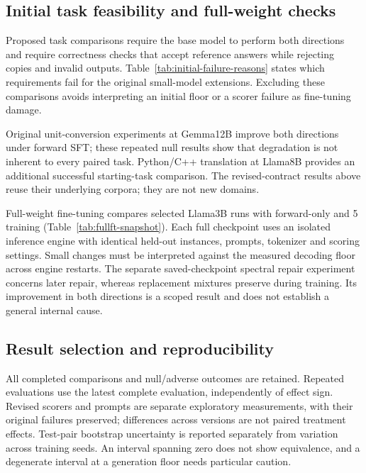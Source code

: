 \subsection{Initial task feasibility and full-weight checks}
\label{app:boundaries}
Proposed task comparisons require the base model to perform both directions and require
correctness checks that accept reference answers while rejecting copies and invalid outputs.
Table~\ref{tab:initial-failure-reasons} states which requirements fail for the original
small-model extensions. Excluding these comparisons avoids interpreting an initial floor
or a scorer failure as fine-tuning damage.



Original unit-conversion experiments at Gemma12B improve both directions under forward SFT;
these repeated null results show that degradation is not inherent to every paired task.
Python/C++ translation at Llama8B provides an additional successful starting-task comparison.
The revised-contract results above reuse their underlying corpora; they are not new domains.

Full-weight fine-tuning compares selected Llama3B runs with forward-only and 5\\%
training (Table~\ref{tab:fullft-snapshot}). Each full checkpoint uses an isolated inference
engine with identical held-out instances, prompts, tokenizer and scoring settings. Small
changes must be interpreted against the measured decoding floor across engine restarts.
The separate saved-checkpoint spectral repair experiment concerns later repair, whereas
replacement mixtures preserve during training. Its improvement in both directions is a
scoped result and does not establish a general internal cause.


\subsection{Result selection and reproducibility}
\label{app:reproducibility}
All completed comparisons and null/adverse outcomes are retained. Repeated evaluations use
the latest complete evaluation, independently of effect sign. Revised scorers and prompts
are separate exploratory measurements, with their original failures preserved; differences
across versions are not paired treatment effects. Test-pair bootstrap uncertainty is reported
separately from variation across training seeds. An interval spanning zero does not show
equivalence, and a degenerate interval at a generation floor needs particular caution.

